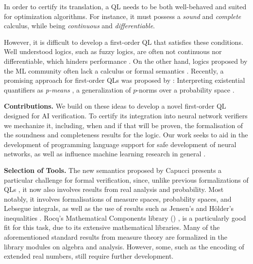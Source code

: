 \documentclass[sigplan, screen, review, nonacm]{acmart}
\begin{document}
In order to certify its translation, a QL needs to be both well-behaved and suited for optimization algorithms. For instance, it must possess a  \textit{sound} and \textit{complete} calculus, while being \textit{continuous} and \textit{differentiable}. 
\begin{comment}   
\begin{itemize}
    \item \textit{Compositionality}: Negation should compose with conjunction and disjunction, while conjunction and disjunction should satisfy the usual properties of idempotence, commutativity, and associativity.
    \item \textit{Quantifier Aggregation}: Quantifiers should be monotonic, continuous, and satisfy boundary conditions.
    \item \textit{Shadow-lifting}: A function should improve if any of its parameters improves.
    \item \textit{Non-vanishing gradients}: A function's gradient should not approximate zero at a sub-interval of the domain.
\end{itemize}
\end{comment}
However, it is difficult to develop a first-order QL that satisfies these conditions. Well understood logics, such as fuzzy logics, are often not continuous nor differentiable, which hinders performance \citep{van2022analyzing}. On the other hand, logics proposed by the ML community often lack a calculus or formal semantics \citep{van2022analyzing, affeldt2024taming}. Recently, a promising approach for first-order QLs was proposed by \citeauthor{capucci2024quantifiers}: 
Interpreting existential quantifiers as \textit{p-means} \citep{capucci2024quantifiers}, a generalization of $p$-norms over a probability space \cite{lpspaces}.  

\textbf{Contributions.} We build on these ideas to develop a novel first-order QL designed for AI verification. To certify its integration into neural network verifiers we mechanize it, including, when and if that will be proven, the formalisation of the soundness and completeness results for the logic. Our work seeks to aid in the development of programming language support for safe development of neural networks, as well as influence machine learning research in general \cite{vehicle,grant}.  

\textbf{Selection of Tools.} The new semantics proposed by Capucci presents a particular challenge for formal verification, since, unlike previous formalizations of QLs \cite{affeldt2024taming}, it now also involves results from real analysis and probability. Most notably, it involves formalisations of measure spaces, probability spaces, and Lebsegue integrals, as well as the use of results such as Jensen's  and Hölder's inequalities \cite{mitrinovic1970analytic}. Rocq's Mathematical Components library (\mathcomp{}) \cite{mathcomp}, is a particularly good fit for this task, due to its extensive mathematical libraries. Many of the aforementioned standard results from measure theory are formalized in the library modules on algebra and analysis. However, some, such as the encoding of extended real numbers, still require further development. 
\end{document}
